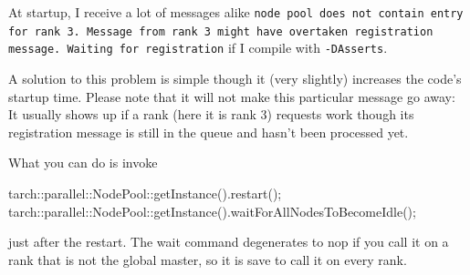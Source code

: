 \begin{smell}
  At startup, I receive a lot of messages alike \texttt{node pool does not
  contain entry for rank 3. Message from rank 3 might have overtaken
  registration message. Waiting for registration} if I compile with
  \texttt{-DAsserts}.
\end{smell}

\noindent
A solution to this problem is simple though it (very slightly) increases the
code's startup time.
Please note that it will not make this particular message go away:  
It usually shows up if a rank (here it is rank 3) requests work though its
registration message is still in the queue and hasn't been processed yet.

What you can do is invoke 
\begin{code}
  tarch::parallel::NodePool::getInstance().restart();
  tarch::parallel::NodePool::getInstance().waitForAllNodesToBecomeIdle();
\end{code}
\noindent
just after the restart.
The wait command degenerates to nop if you call it on a rank that is not the
global master, so it is save to call it on every rank.
